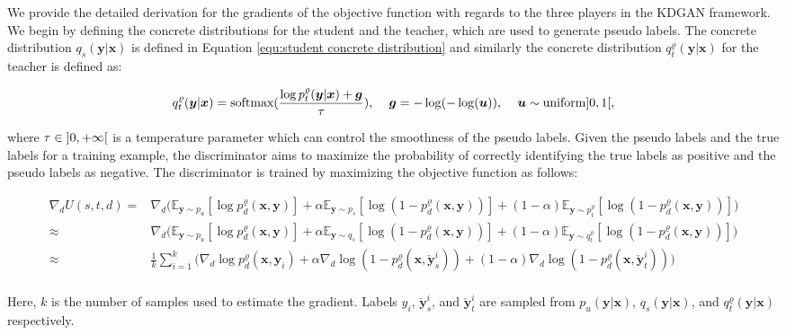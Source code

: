 \documentclass{article}
\newcommand{\OVEC}[1]{\bm{#1}} %
\newcommand{\SVEC}[1]{\check{\bm{#1}}}
\newcommand{\UTIL}[1]{U(s,t,d)} %
\newcommand{\EXP}{\mathbb{E}} %
\newcommand{\abbrpdat}{p_{u}}
\newcommand{\fullpdat}{p_{u}(\OVEC{y}|\OVEC{x})}
\newcommand{\abbrpstd}{p_{s}}
\newcommand{\abbrqstd}{q_{s}}
\newcommand{\fullqstd}[1]{q_{s}(#1|\OVEC{x})}
\newcommand{\abbrptch}{p_{t}^{\varrho}}
\newcommand{\abbrqtch}{q_{t}^{\varrho}}
\newcommand{\fullptch}[1]{p_{t}^{\varrho}(#1|\OVEC{x})}
\newcommand{\fullqtch}[1]{q_{t}^{\varrho}(#1|\OVEC{x})}
\newcommand{\fullpdis}[1]{p_{d}^{\varrho}(\OVEC{x},#1)}
\begin{document}
We provide the detailed derivation for the gradients of the objective function with regards to the three players in the KDGAN framework.
We begin by defining the concrete distributions for the student and the teacher, which are used to generate pseudo labels.
The concrete distribution $\fullqstd{\OVEC{y}}$ is defined in Equation \ref{equ:student concrete distribution} and similarly the concrete distribution $\fullqtch{\OVEC{y}}$ for the teacher is defined as:
\begin{small}
\begin{equation*} \label{equ:teacher concrete distribution}
\begin{aligned}
\fullqtch{\OVEC{y}}
=
\text{softmax}(\frac{\log\fullptch{\OVEC{y}}+\OVEC{g}}{\tau})
\text{, }
\quad
\OVEC{g}=-\log(-\log(\OVEC{u}))
\text{, }
\quad
\OVEC{u}\sim\text{uniform}\interval[open left, open right]{0}{1}
\text{,}
\end{aligned}
\end{equation*}
\end{small}%
where $\tau\in\interval[open left, open right]{0}{+\infty}$ is a temperature parameter which can control the smoothness of the pseudo labels.
Given the pseudo labels and the true labels for a training example, the discriminator aims to maximize the probability of correctly identifying the true labels as positive and the pseudo labels as negative.
The discriminator is trained by maximizing the objective function as follows:
\begin{small}
\begin{equation*}
\begin{aligned}
\nabla_{d}
\UTIL{}
=
&
\nabla_{d}
\big(
\EXP_{\OVEC{y}\sim\abbrpdat}[\log\fullpdis{\OVEC{y}}]
+
\alpha
\EXP_{\OVEC{y}\sim\abbrpstd}[\log(1-\fullpdis{\OVEC{y}})]
+
(1 - \alpha)
\EXP_{\OVEC{y}\sim\abbrptch}[\log(1-\fullpdis{\OVEC{y}})]
\big)
\\
\approx
&
\nabla_{d}
\big(
\EXP_{\OVEC{y}\sim\abbrpdat}[\log\fullpdis{\OVEC{y}}]
+
\alpha
\EXP_{\OVEC{y}\sim\abbrqstd}[\log(1-\fullpdis{\OVEC{y}})]
+
(1 - \alpha)
\EXP_{\OVEC{y}\sim\abbrqtch}[\log(1-\fullpdis{\OVEC{y}})]
\big)
\\
\approx
&
{\textstyle\frac{1}{k}}
{\textstyle\sum}_{i=1}^{k}
\big(
\nabla_{d}
\log\fullpdis{\OVEC{y}_{i}}
+
\alpha\nabla_{d}\log(1-\fullpdis{\SVEC{y}^{i}_{s}})
+
(1-\alpha)\nabla_{d}\log(1-\fullpdis{\SVEC{y}^{i}_{t}})
\big)
\\
\end{aligned}
\end{equation*}
\end{small}%
Here, $k$ is the number of samples used to estimate the gradient.
Labels $y_{i}$, $\SVEC{y}^{i}_{s}$, and $\SVEC{y}^{i}_{t}$ are sampled from $\fullpdat$, $\fullqstd{\OVEC{y}}$, and $\fullqtch{\OVEC{y}}$ respectively.
\end{document}
